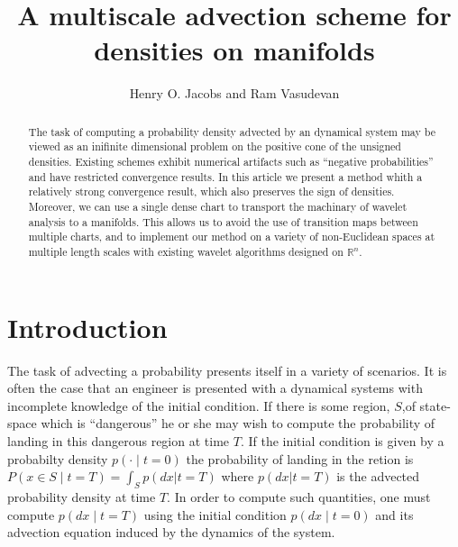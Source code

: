 \documentclass[letterpaper, 10 pt, conference]{ieeeconf}
\title{\LARGE \bf
  A 
  multiscale
  advection scheme for
  densities on manifolds
}
\author{Henry O. Jacobs and Ram Vasudevan}%
\newcommand{\R}{\mathbb{R}}
\begin{document}
\maketitle
\thispagestyle{empty}
\pagestyle{empty}


\begin{abstract}
  The task of computing a probability density advected by an 
  dynamical system may be viewed as an inifinite dimensional problem
  on the positive cone of the unsigned densities.
  Existing schemes exhibit numerical artifacts such as
  ``negative probabilities'' and have restricted convergence results.
  In this article we present a method whith a relatively strong
  convergence result, which also preserves the sign of densities.
  Moreover, we can use a single dense chart to transport the machinary of wavelet analysis to a manifolds.
  This allows us to avoid the use of transition maps between multiple charts, and to implement our method on a variety of non-Euclidean spaces at multiple length scales with existing wavelet algorithms designed on $\R^n$.
\end{abstract}


\section{Introduction}
  The task of advecting a probability presents itself
  in a variety of scenarios.
  It is often the case that an engineer is presented
  with a dynamical systems with incomplete knowledge
  of the initial condition.
  If there is some region, $S$,of state-space which is ``dangerous''
  he or she may wish to compute the probability of landing
  in this dangerous region at time $T$.
  If the initial condition is given by a probabilty density $p(\cdot \mid t=0)$
  the probability of landing in the retion is $P( x \in S \mid t = T)  = \int_S p( dx | t=T )$ where $p(dx|t=T)$ is the advected probability density at time $T$.
  In order to compute such quantities, one must compute $p(dx\mid t=T)$
  using the initial condition $p(dx\mid t=0)$ and its
  advection equation induced by the dynamics of the system.
\end{document}
